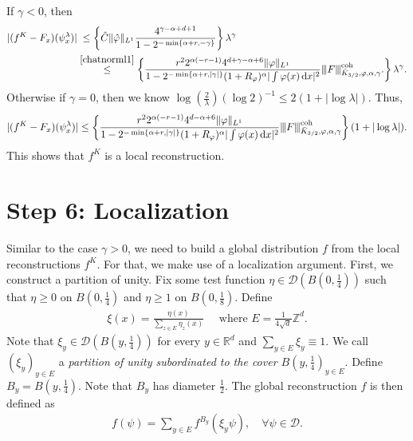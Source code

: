 If \(\gamma < 0\), then 
\begin{align}
    |(f^K - F_x)(\psi_x^\lambda)| &\;\leq \left\{  \hat C\lVert \hat \varphi \rVert_{L^1}  \frac{4^{\gamma - \alpha + d + 1}}{1 - 2^{-\min\left\{ \alpha + r, - \gamma \right\}}} \right\} \lambda^\gamma \nonumber \\
    &\overset{\eqref{chatnorml1}}{\leq} \left\{ 
        \frac{r^2 2^{\alpha(-r-1)} 4^{d+ \gamma -\alpha + 6} \lVert \varphi \rVert_{L^1}}{1-2^{- \min \left\{ \alpha + r, |\gamma| \right\}} (1+R_{\varphi})^\alpha |\int \varphi(x) \, \mathrm{d}x|^2 }
        {\left\vert\kern-0.25ex\left\vert\kern-0.25ex\left\vert F \right\vert\kern-0.25ex\right\vert\kern-0.25ex\right\vert}^{\mathrm{coh}}_{\bar K_{3/2}, \varphi, \alpha, \gamma}.
     \right\}
     \lambda^\gamma. \label{MacbookAirGammaNegative}
\end{align} 
Otherwise if \(\gamma = 0\), then we know \(\log(\frac{2}{\lambda}) (\log{2})^{-1} \leq 2(1 + |\log \lambda|)\). Thus,
\begin{align*}
    |(f^K - F_x)(\psi_x^\lambda)| \leq \left\{ 
        \frac{r^2 2^{\alpha(-r-1)} 4^{d -\alpha + 6} \lVert \varphi \rVert_{L^1}}{1-2^{- \min \left\{ \alpha + r, |\gamma| \right\}} (1+R_{\varphi})^\alpha |\int \varphi(x) \, \mathrm{d}x|^2 }
        {\left\vert\kern-0.25ex\left\vert\kern-0.25ex\left\vert F \right\vert\kern-0.25ex\right\vert\kern-0.25ex\right\vert}^{\mathrm{coh}}_{\bar K_{3/2}, \varphi, \alpha, \gamma}
     \right\}
     (1 + |\log \lambda|).
\end{align*} 
This shows that \(f^K\) is a local reconstruction. 






\section{Step 6: \texorpdfstring{Localization}{Localization}}\label{chapter:step6gammaNegative}


Similar to the case \(\gamma > 0\), we need to build a global distribution \(f\) from the local reconstructions \(f^K\). For that, we make use of a localization argument. First, we construct a partition of unity. Fix some test function \(\eta \in \mathcal{D}(B(0, \frac{1}{4}))\) such that \(\eta \geq 0\) on \(B(0, \frac{1}{4})\) and \(\eta \geq 1\) on \(B(0, \frac{1}{8})\). Define 
\begin{align*}
    \xi(x) = \frac{\eta(x)}{\sum\limits_{z \in E} \eta_z(x)} \quad \text{ where } E = \frac{1}{4\sqrt{d}} \mathbb{Z}^d.
\end{align*}
Note that \(\xi_y \in \mathcal{D}(B(y, \frac{1}{4}))\) for every \(y \in \mathbb{R}^d\) and \(\sum\limits_{y \in E} \xi_y \equiv 1\). We call \((\xi_y)_{y \in E}\) a \emph{partition of unity subordinated to the cover \(B(y, \frac{1}{4})_{y \in E}\)}. Define \(B_y = B(y, \frac{1}{4})\). Note that \(B_y\) has diameter \(\frac{1}{2}\). The global reconstruction \(f\) is then defined as
\begin{align*}
    f(\psi) = \sum_{y \in E} f^{B_y}(\xi_y \psi), \quad \forall \psi \in \mathcal{D}.
\end{align*}

